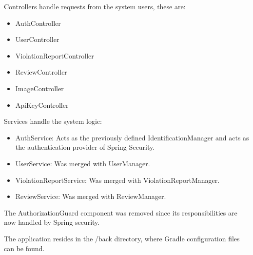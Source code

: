 Controllers handle requests from the system users, these are: 
\begin{itemize}[label={\textbf{-}}, leftmargin=2cm]  \itemsep0em
    \item AuthController
    \item UserController
    \item ViolationReportController
    \item ReviewController
    \item ImageController
    \item ApiKeyController
\end{itemize}

Services handle the system logic:
\begin{itemize}[label={\textbf{-}}, leftmargin=2cm] \itemsep0em
    \item AuthService: Acts as the previously defined IdentificationManager and acts as the authentication provider of Spring Security.
    \item UserService: Was merged with UserManager.
    \item ViolationReportService: Was merged with ViolationReportManager.
    \item ReviewService: Was merged with ReviewManager.
\end{itemize}

The AuthorizationGuard component was removed since its responsibilities are now handled by Spring security.

The application resides in the /back directory, where Gradle configuration files can be found.

